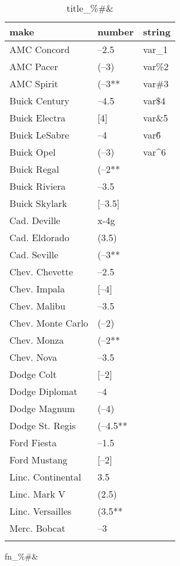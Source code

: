 \documentclass{article}
\begin{document}
\begin{table}[tbp] \centering
{}

\caption{title\_\%\#\&}
\begin{tabularx}{\linewidth}{lCC}

\toprule
{make}&{number}&{string} \tabularnewline
\midrule \addlinespace[\belowrulesep]
AMC Concord&--2.5&var\_1 \tabularnewline
AMC Pacer&(--3)&var\%2 \tabularnewline
AMC Spirit&(--3**&var\#3 \tabularnewline
Buick Century&--4.5&var\$4 \tabularnewline
Buick Electra&[4]&var\&5 \tabularnewline
Buick LeSabre&--4&var\~6 \tabularnewline
Buick Opel&(--3)&var\^{}6 \tabularnewline
Buick Regal&(--2**& \tabularnewline
Buick Riviera&--3.5& \tabularnewline
Buick Skylark&[--3.5]& \tabularnewline
Cad. Deville&x-4g& \tabularnewline
Cad. Eldorado&(3.5)& \tabularnewline
Cad. Seville&(--3**& \tabularnewline
Chev. Chevette&--2.5& \tabularnewline
Chev. Impala&[--4]& \tabularnewline
Chev. Malibu&--3.5& \tabularnewline
Chev. Monte Carlo&(--2)& \tabularnewline
Chev. Monza&(--2**& \tabularnewline
Chev. Nova&--3.5& \tabularnewline
Dodge Colt&[--2]& \tabularnewline
Dodge Diplomat&--4& \tabularnewline
Dodge Magnum&(--4)& \tabularnewline
Dodge St. Regis&(--4.5**& \tabularnewline
Ford Fiesta&--1.5& \tabularnewline
Ford Mustang&[--2]& \tabularnewline
Linc. Continental&3.5& \tabularnewline
Linc. Mark V&(2.5)& \tabularnewline
Linc. Versailles&(3.5**& \tabularnewline
Merc. Bobcat&--3& \tabularnewline
\bottomrule \addlinespace[\belowrulesep]

\end{tabularx}
\begin{flushleft}
\footnotesize fn\_\%\#\&
\end{flushleft}
\end{table}
\end{document}
